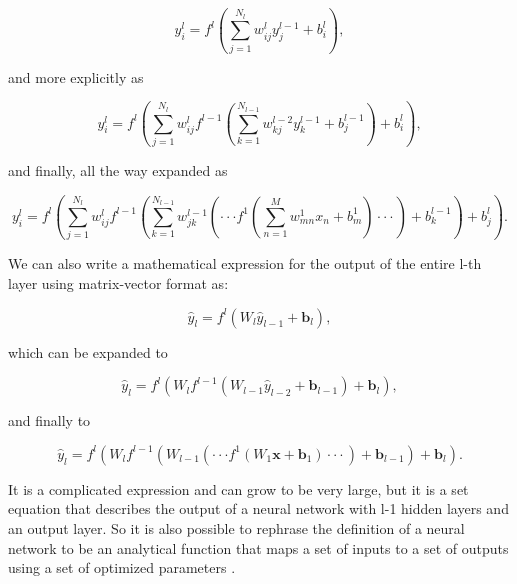 		\begin{equation}\label{n_th_hidden_layer}
			y_i^l = f^l(\sum_{j=1}^{N_l} w_{ij}^ly_j^{l-1} + b_i^l),
		\end{equation}

		and more explicitly as

		\begin{equation}\label{n_th_hidden_layer_expanded_1}
			y_i^l = f^l(\sum_{j=1}^{N_l} w_{ij}^lf^{l-1}(\sum_{k=1}^{N_{l-1}} w_{kj}^{l-2}y_k^{l-1} + b_j^{l-1}) + b_i^l),
		\end{equation}

		and finally, all the way expanded as

		\begin{equation}\label{n_th_hidden_layer_expanded_2}
			y_i^l = f^l(\sum_{j=1}^{N_l} w_{ij}^l f^{l-1}(\sum_{k=1}^{N_{l-1}} w_{jk}^{l-1}( \cdot \cdot \cdot f^1(\sum_{n=1}^M w_{mn}^1x_n + b_m^1) \cdot \cdot \cdot ) + b_k^{l-1}) + b_j^l).
		\end{equation}

		We can also write a mathematical expression for the output of the entire l-th layer using matrix-vector format as:

		\begin{equation}\label{n_th_hidden_layer_mv}
			\hat{y}_l = f^l (W_l \hat{y}_{l-1} + \textbf{b}_l),
		\end{equation}

		which can be expanded to

		\begin{equation}\label{n_th_hidden_layer_mv_expanded_1}
			\hat{y}_l = f^l(W_lf^{l-1}(W_{l-1}\hat{y}_{l-2} + \textbf{b}_{l-1}) + \textbf{b}_l),
		\end{equation}

		and finally to

		\begin{equation}\label{n_th_hidden_layer_mv_expanded_2}
			\hat{y}_l = f^l(W_lf^{l-1}(W_{l-1}(\cdot \cdot \cdot f^1(W_1\textbf{x} + \textbf{b}_1) \cdot \cdot \cdot) + \textbf{b}_{l-1}) + \textbf{b}_l).
		\end{equation}

		It is a complicated expression and can grow to be very large, but it is a set equation that describes the output of a neural network with l-1 hidden layers and an output layer. So it is also possible to rephrase the definition of a neural network to be an analytical function that maps a set of inputs to a set of outputs using a set of optimized parameters \cite{Ref6}.

